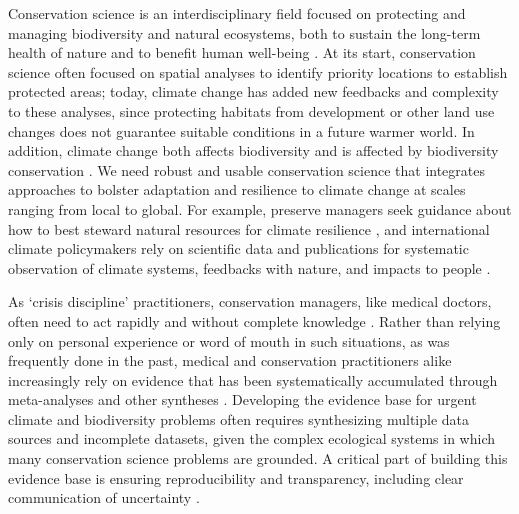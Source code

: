 \documentclass{article}
\begin{document}
Conservation science is an interdisciplinary field focused on protecting and managing biodiversity and natural ecosystems, both to sustain the long-term health of nature and to benefit human well-being \citep{kareiva2012conservation}. At its start, conservation science often focused on spatial analyses to identify priority locations to establish protected areas\citep{bocking2020science}; today, climate change has added new feedbacks and complexity to these analyses, since protecting habitats from development or other land use changes does not guarantee suitable conditions in a future warmer world. In addition, climate change both affects biodiversity \citep[e.g., by causing extinctions][]{urban2024climate} and is affected by biodiversity conservation \citep[e.g., nature-based climate solutions or `natural climate solutions'][]{griscom2017natural}. We need robust and usable conservation science that integrates approaches to bolster adaptation and resilience to climate change at scales ranging from local to global. For example, preserve managers seek guidance about how to best steward natural resources for climate resilience \citep{Nadeau2015}, and  international climate policymakers rely on scientific data and publications for systematic observation of climate systems, feedbacks with nature, and impacts to people \cite{ipcc2007}. 

\par As `crisis discipline' practitioners, conservation managers, like medical doctors, often need to act rapidly and without complete knowledge \citep{soule1985conservation}. Rather than relying only on personal experience or word of mouth in such situations, as was frequently done in the past, medical and conservation practitioners alike increasingly rely on evidence that has been systematically accumulated through meta-analyses and other syntheses \citep{kareiva2012conservation}. Developing the evidence base for urgent climate and biodiversity problems often requires synthesizing multiple data sources and incomplete datasets, given the complex ecological systems in which many conservation science problems are grounded. A critical part of building this evidence base is ensuring reproducibility and transparency, including clear communication of uncertainty \citep{ellis2024principles,ipcc2007}. 
\end{document}
